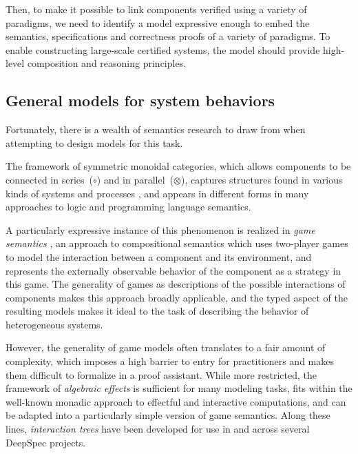 \documentclass[sigplan,screen]{acmart}
\begin{document}
Then,
to make it possible to link components
verified using a variety of paradigms,
we need to identify a model
expressive enough to embed
the semantics, specifications and correctness proofs
of a variety of paradigms.
To enable constructing large-scale certified systems,
the model should provide
high-level composition and reasoning principles.


\subsection{General models for system behaviors} %
\label{ssec:genmodel}

Fortunately,
there is a wealth of semantics research to draw from
when attempting to design models for this task.

The framework of
symmetric monoidal categories,
which allows components to be
connected in series~($\circ$) and in parallel~($\otimes$),
captures structures found
in various kinds of systems and processes \cite{rosetta},
and appears in different forms
in many approaches to logic and programming language semantics.

A particularly expressive instance of this phenomenon
is realized in \emph{game semantics} \cite{cspgs},
an approach to compositional semantics
which uses two-player games to model
the interaction between a component and its environment,
and represents the externally observable behavior
of the component as a strategy in this game.
The generality of games as
descriptions of the possible interactions of components
makes this approach broadly applicable,
and the typed aspect of the resulting models
makes it ideal to the task of
describing the behavior of heterogeneous systems.

However,
the generality of game models
often translates to a fair amount of complexity,
which imposes a high barrier to entry for practitioners
and makes them difficult to formalize in a proof assistant.
While more restricted,
the framework of \emph{algebraic effects} \cite{effadq}
is sufficient for many modeling tasks,
fits within the well-known monadic approach
to effectful and interactive computations,
and can be adapted into a particularly simple version
of game semantics.
Along these lines,
\emph{interaction trees} \cite{itree}
have been developed for use in and across
several DeepSpec projects.

\end{document}
